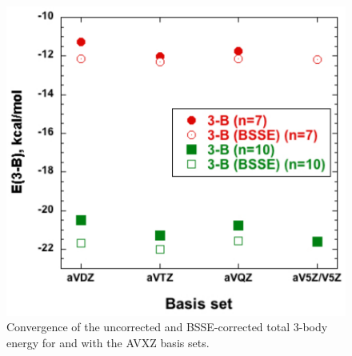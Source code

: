 \begin{figure}[t]
\uwsinglespace
\centering\includegraphics[width=.7\textwidth]{Figures/Chapter_2/E_3B_7_10.pdf}
\begin{spacing}{1.0}
\caption[Convergence of the uncorrected and BSSE-corrected total 3-body energy for  and  with the AVXZ basis sets.]{Convergence of the uncorrected and BSSE-corrected total 3-body energy for  and  with the AVXZ basis sets.}\label{fig:MBE_I_F7}
\end{spacing}
\end{figure}